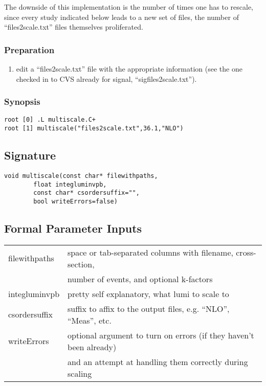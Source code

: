 \documentclass[english]{article}
\begin{document}
The downside of this implementation is the number of times one has to rescale,
since every study indicated below leads to a new set of files, the number
of ``files2scale.txt'' files themselves proliferated.

\subsubsection{Preparation}
\begin{enumerate}
\item edit a ``files2scale.txt'' file with the appropriate information
(see the one checked in to CVS already for signal, ``sigfiles2scale.txt'').
\end{enumerate}
\subsubsection{Synopsis}
\begin{lstlisting}
root [0] .L multiscale.C+
root [1] multiscale("files2scale.txt",36.1,"NLO")
\end{lstlisting}

\subsection{Signature}
\begin{lstlisting}
void multiscale(const char* filewithpaths,
		float integluminvpb,
		const char* csordersuffix="",
		bool writeErrors=false)
\end{lstlisting}

\subsection{Formal Parameter Inputs}
\begin{tabular}{|l|l|}
\hline
filewithpaths & space or tab-separated columns with filename, cross-section,  \\
              & number of events, and optional k-factors                      \\ \hline
integluminvpb & pretty self explanatory, what lumi to scale to                \\ \hline
csordersuffix & suffix to affix to the output files, e.g. ``NLO'', ``Meas'', etc. \\ \hline
writeErrors   & optional argument to turn on errors (if they haven't been already) \\
              & and an attempt at handling them correctly during scaling      \\ \hline
\end{tabular}
\end{document}
